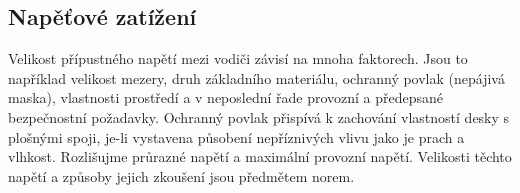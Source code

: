   \subsection{Napěťové zatížení}
    Velikost přípustného napětí mezi vodiči závisí na mnoha faktorech. Jsou to například velikost
    mezery, druh základního materiálu, ochranný povlak (nepájivá maska), vlastnosti prostředí a
    v neposlední řade provozní a předepsané bezpečnostní požadavky. Ochranný povlak přispívá
    k zachování vlastností desky s plošnými spoji, je-li vystavena působení nepříznivých vlivu
    jako je prach a vlhkost. Rozlišujme průrazné napětí a maximální provozní napětí. Velikosti 
    těchto napětí a způsoby jejich zkoušení jsou předmětem norem. 

